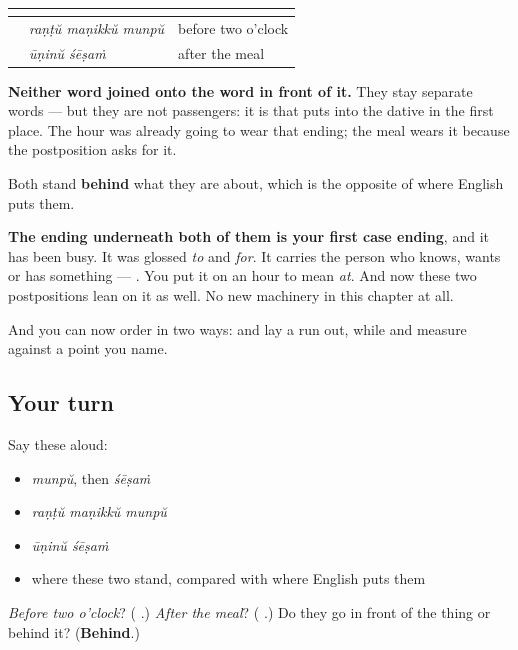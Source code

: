 \begin{grammarlens}[title={Grammar Lens: both of them lean, and neither of them attaches}]
\noindent
\begin{tabularx}{\linewidth}{@{}>{\raggedright\arraybackslash}X>{\raggedright\arraybackslash}X>{\raggedright\arraybackslash}X@{}}
\toprule
\textbf{} & \textbf{} & \textbf{} \\
\midrule
\textbf{\ml{രണ്ട്} \ml{മണിക്ക്} \ml{മുൻപ്}} & \emph{raṇṭŭ maṇikkŭ munpŭ} & before two o'clock \\
\textbf{\ml{ഊണിന്} \ml{ശേഷം}} & \emph{ūṇinŭ śēṣaṁ} & after the meal \\
\bottomrule
\end{tabularx}

\textbf{Neither word joined onto the word in front of it.} They stay separate words — but they are not passengers: it is \textbf{} that puts \textbf{} into the dative in the first place. The hour was already going to wear that ending; the meal wears it because the postposition asks for it.

Both stand \textbf{behind} what they are about, which is the opposite of where English puts them.
\end{grammarlens}

\begin{grammarlens}[title={What you've built}]
\textbf{The ending underneath both of them is your first case ending}, and it has been busy. It was glossed \emph{to} and \emph{for}. It carries the person who knows, wants or has something — \textbf{}. You put it on an hour to mean \emph{at}. And now these two postpositions lean on it as well. No new machinery in this chapter at all.

And you can now order in two ways: \textbf{} and \textbf{} lay a run out, while \textbf{} and \textbf{} measure against a point you name.
\end{grammarlens}

\subsection*{Your turn}
Say these aloud:

\begin{itemize}
\raggedright
  \item \emph{munpŭ}, then \emph{śēṣaṁ}
  \item \emph{raṇṭŭ maṇikkŭ munpŭ}
  \item \emph{ūṇinŭ śēṣaṁ}
  \item where these two stand, compared with where English puts them
\end{itemize}

\begin{tcolorbox}[breakable,colback=teal!4,colframe=teal!35!black,title={Before you move on}]
\emph{Before two o'clock}? (\textbf{  }.) \emph{After the meal}? (\textbf{ }.) Do they go in front of the thing or behind it? (\textbf{Behind}.)
\end{tcolorbox}
